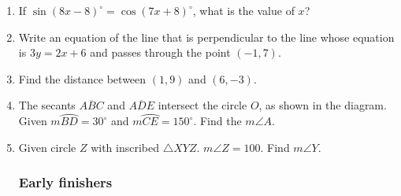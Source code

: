 \documentclass[12pt, twoside]{article}
\begin{document}
\begin{enumerate}
  \item If $\sin (8x-8)^\circ = \cos(7x+8)^\circ$, what is the value of $x$? \vspace{3cm}

  \item Write an equation of the line that is perpendicular to the line whose equation is $3y=2x+6$ and passes through the point $(-1,7)$. \vspace{2cm}

  \item Find the distance between $(1,9)$ and $(6, -3)$.



\newpage
  \item The secants $\overline{ABC}$ and $\overline{ADE}$ intersect the circle $O$, as shown in the diagram. \\Given $m \wideparen{BD}=30^\circ$ and $m \wideparen{CE}=150^\circ$. Find the $m\angle A$.
       \begin{center}
     \end{center} \vspace{2cm}

   \item Given circle $Z$ with inscribed $\triangle XYZ$. $m\angle Z=100$. Find $m\angle Y$.\\[1cm]
        \vspace{3cm}

\newpage
\subsubsection*{Early finishers}


\end{enumerate}
\end{document}
